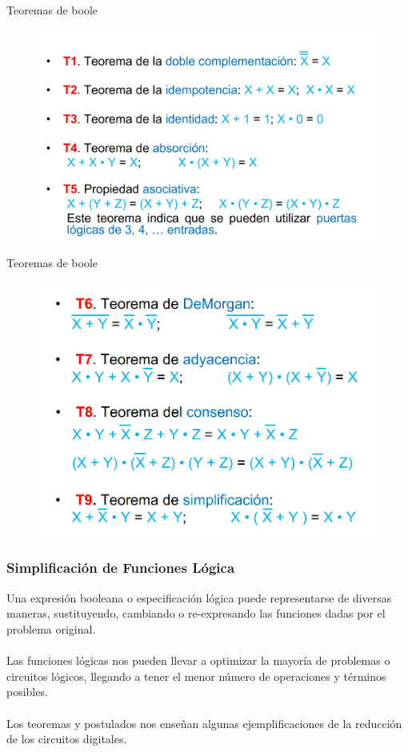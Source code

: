 \documentclass[aspectratio=169]{beamer}
\begin{document}
\begin{frame}{Teoremas de boole}
    \begin{figure}
        \includegraphics[scale=.3]{fig/prop_1.png}
    \end{figure}
\end{frame}

\begin{frame}{Teoremas de boole}
    \begin{figure}
        \includegraphics[scale=.3]{fig/prop_2.png}
    \end{figure}
\end{frame}

\begin{frame}
\frametitle{Simplificación de Funciones Lógica}
    \alert{Una expresión booleana o especificación lógica puede representarse de diversas maneras, sustituyendo, cambiando o re-expresando las funciones dadas por el problema original}.\\
    \hspace{2px}
    \\Las funciones lógicas nos pueden llevar a optimizar la mayoría de problemas o circuitos lógicos, llegando a tener el menor número de operaciones y términos posibles.\\
    \hspace{2px}
    \\\alert{Los teoremas y postulados nos enseñan algunas ejemplificaciones de la reducción de los circuitos digitales}.
\end{frame}
\end{document}
